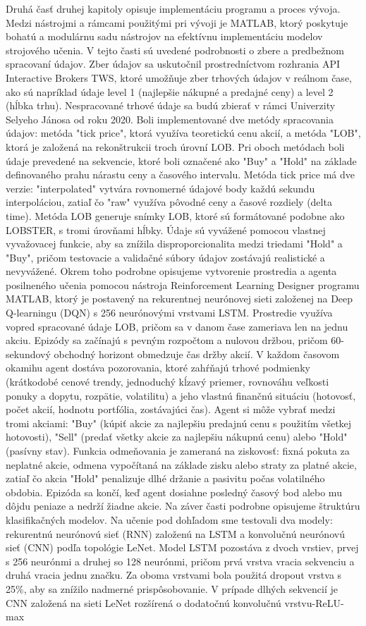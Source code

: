 \documentclass[a4paper,oneside,onecolumn,12pt]{book}
\begin{document}
Druhá časť druhej kapitoly opisuje implementáciu programu a proces vývoja. Medzi nástrojmi a rámcami použitými pri vývoji je MATLAB, ktorý poskytuje bohatú a modulárnu sadu nástrojov na efektívnu implementáciu modelov strojového učenia. V tejto časti sú uvedené podrobnosti o zbere a predbežnom spracovaní údajov. Zber údajov sa uskutočnil prostredníctvom rozhrania API Interactive Brokers TWS, ktoré umožňuje zber trhových údajov v reálnom čase, ako sú napríklad údaje level 1 (najlepšie nákupné a predajné ceny) a level 2 (hĺbka trhu). Nespracované trhové údaje sa budú zbierať v rámci Univerzity Selyeho Jánosa od roku 2020. Boli implementované dve metódy spracovania údajov: metóda "tick price", ktorá využíva teoretickú cenu akcií, a metóda "LOB", ktorá je založená na rekonštrukcii troch úrovní LOB. Pri oboch metódach boli údaje prevedené na sekvencie, ktoré boli označené ako "Buy" a "Hold" na základe definovaného prahu nárastu ceny a časového intervalu. Metóda tick price má dve verzie: "interpolated" vytvára rovnomerné údajové body každú sekundu interpoláciou, zatiaľ čo "raw" využíva pôvodné ceny a časové rozdiely (delta time). Metóda LOB generuje snímky LOB, ktoré sú formátované podobne ako LOBSTER, s tromi úrovňami hĺbky. Údaje sú vyvážené pomocou vlastnej vyvažovacej funkcie, aby sa znížila disproporcionalita medzi triedami "Hold" a "Buy", pričom testovacie a validačné súbory údajov zostávajú realistické a nevyvážené. Okrem toho podrobne opisujeme vytvorenie prostredia a agenta posilneného učenia pomocou nástroja Reinforcement Learning Designer programu MATLAB, ktorý je postavený na rekurentnej neurónovej sieti založenej na Deep Q-learningu (DQN) s 256 neurónovými vrstvami LSTM. Prostredie využíva vopred spracované údaje LOB, pričom sa v danom čase zameriava len na jednu akciu. Epizódy sa začínajú s pevným rozpočtom a nulovou držbou, pričom 60-sekundový obchodný horizont obmedzuje čas držby akcií. V každom časovom okamihu agent dostáva pozorovania, ktoré zahŕňajú trhové podmienky (krátkodobé cenové trendy, jednoduchý kĺzavý priemer, rovnováhu veľkosti ponuky a dopytu, rozpätie, volatilitu) a jeho vlastnú finančnú situáciu (hotovosť, počet akcií, hodnotu portfólia, zostávajúci čas). Agent si môže vybrať medzi tromi akciami: "Buy" (kúpiť akcie za najlepšiu predajnú cenu s použitím všetkej hotovosti), "Sell" (predať všetky akcie za najlepšiu nákupnú cenu) alebo "Hold" (pasívny stav). Funkcia odmeňovania je zameraná na ziskovosť: fixná pokuta za neplatné akcie, odmena vypočítaná na základe zisku alebo straty za platné akcie, zatiaľ čo akcia "Hold" penalizuje dlhé držanie a pasivitu počas volatilného obdobia. Epizóda sa končí, keď agent dosiahne posledný časový bod alebo mu dôjdu peniaze a nedrží žiadne akcie. Na záver časti podrobne opisujeme štruktúru klasifikačných modelov. Na učenie pod dohľadom sme testovali dva modely: rekurentnú neurónovú sieť (RNN) založenú na LSTM a konvolučnú neurónovú sieť (CNN) podľa topológie LeNet. Model LSTM pozostáva z dvoch vrstiev, prvej s 256 neurónmi a druhej so 128 neurónmi, pričom prvá vrstva vracia sekvenciu a druhá vracia jednu značku. Za oboma vrstvami bola použitá dropout vrstva s 25\%, aby sa znížilo nadmerné prispôsobovanie. V prípade dlhých sekvencií je CNN založená na sieti LeNet rozšírená o dodatočnú konvolučnú vrstvu-ReLU-max 
\end{document}
